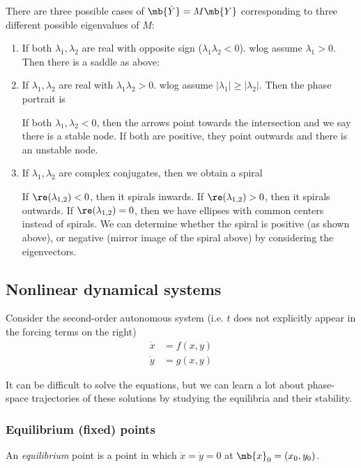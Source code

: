 \documentclass[a4paper]{article}
\begin{document}
There are three possible cases of $\mb{\dot{Y}} = M\mb{Y}$ corresponding to three different possible eigenvalues of $M$:
\begin{enumerate}
\item If both $\lambda_1, \lambda_2$ are real with opposite sign ($\lambda_1\lambda_2 < 0$). wlog assume $\lambda_1 > 0$. Then there is a saddle as above:


\item If $\lambda_1, \lambda_2$ are real with $\lambda_1\lambda_2 > 0$. wlog assume $|\lambda_1| \geq |\lambda_2|$. Then the phase portrait is


  If both $\lambda_1, \lambda_2 < 0$, then the arrows point towards the intersection and we say there is a stable node. If both are positive, they point outwards and there is an unstable node.
  \newpage %
\item If $\lambda_1, \lambda_2$ are complex conjugates, then we obtain a spiral


  If $\re (\lambda_{1, 2}) < 0$, then it spirals inwards. If $\re (\lambda_{1, 2}) > 0$, then it spirals outwards. If $\re (\lambda_{1, 2}) = 0$, then we have ellipses with common centers instead of spirals. We can determine whether the spiral is positive (as shown above), or negative (mirror image of the spiral above) by considering the eigenvectors.
\end{enumerate}

\subsection{Nonlinear dynamical systems}
Consider the second-order autonomous system (i.e. $t$ does not explicitly appear in the forcing terms on the right)
\begin{align*}
  \dot x &= f(x, y)\\
  \dot y &= g(x, y)
\end{align*}

It can be difficult to solve the equations, but we can learn a lot about phase-space trajectories of these solutions by studying the equilibria and their stability.

\subsubsection{Equilibrium (fixed) points}
\begin{defi}
  An \emph{equilibrium} point is a point in which $\dot x = \dot y = 0$ at $\mb{x}_0 = (x_0, y_0)$.
\end{defi}
\end{document}
